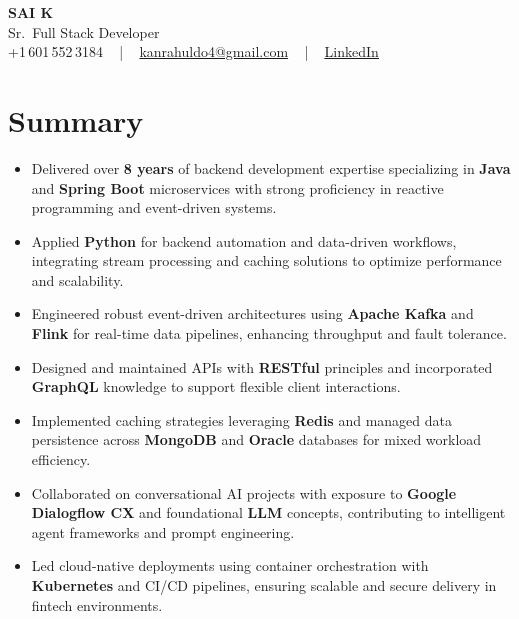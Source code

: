 \documentclass[letterpaper,11pt]{article}
\newcommand{\resumeItem}[1]{
  \item\footnotesize{
    {#1 \vspace{-2pt}}
  }
}
\newcommand{\resumeItemListStart}{\begin{itemize}[leftmargin=*]}
\newcommand{\resumeItemListEnd}{\end{itemize}\vspace{-5pt}}
\begin{document}
\begin{center}
    {\fontsize{14pt}{12pt}\selectfont \textbf{\MakeUppercase{Sai K}}}\\ \vspace{2pt}
    \fontsize{10pt}{12pt}\selectfont Sr.\ Full Stack Developer\\ \vspace{2pt}
    \fontsize{10pt}{12pt}\selectfont +1\,601\,552\,3184 ~ | ~
    \href{mailto:kanrahuldo4@gmail.com}{kanrahuldo4@gmail.com} ~ | ~
    \href{https://www.linkedin.com/in/srrrk/}{\color{blue}\underline{LinkedIn}}
    \vspace{-10pt}
\end{center}

\section{Summary}
\fontsize{9pt}{10pt}\selectfont
\resumeItemListStart
  \resumeItem{Delivered over \textbf{8 years} of backend development expertise specializing in \textbf{Java} and \textbf{Spring Boot} microservices with strong proficiency in reactive programming and event-driven systems.}
  \resumeItem{Applied \textbf{Python} for backend automation and data-driven workflows, integrating stream processing and caching solutions to optimize performance and scalability.}
  \resumeItem{Engineered robust event-driven architectures using \textbf{Apache Kafka} and \textbf{Flink} for real-time data pipelines, enhancing throughput and fault tolerance.}
  \resumeItem{Designed and maintained APIs with \textbf{RESTful} principles and incorporated \textbf{GraphQL} knowledge to support flexible client interactions.}
  \resumeItem{Implemented caching strategies leveraging \textbf{Redis} and managed data persistence across \textbf{MongoDB} and \textbf{Oracle} databases for mixed workload efficiency.}
  \resumeItem{Collaborated on conversational AI projects with exposure to \textbf{Google Dialogflow CX} and foundational \textbf{LLM} concepts, contributing to intelligent agent frameworks and prompt engineering.}
  \resumeItem{Led cloud-native deployments using container orchestration with \textbf{Kubernetes} and CI/CD pipelines, ensuring scalable and secure delivery in fintech environments.}
\resumeItemListEnd
\vspace{-6pt}

\end{document}

